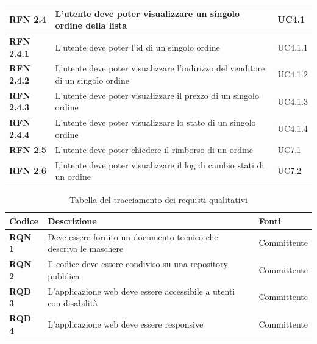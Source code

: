 \begin{longtable}[c]{|l|p{8.4cm}|l|}
\textbf{RFN 2.4} & L’utente deve poter visualizzare un singolo ordine della lista & UC4.1 \\ \hline

\textbf{RFN 2.4.1} & L’utente deve poter l'id di un singolo ordine & UC4.1.1 \\ \hline

\textbf{RFN 2.4.2} & L’utente deve poter visualizzare l'indirizzo del venditore di un singolo ordine & UC4.1.2 \\ \hline

\textbf{RFN 2.4.3} & L’utente deve poter visualizzare il prezzo di un singolo ordine & UC4.1.3 \\ \hline

\textbf{RFN 2.4.4} & L’utente deve poter visualizzare lo stato di un singolo ordine & UC4.1.4 \\ \hline

\textbf{RFN 2.5} & L’utente deve poter chiedere il rimborso di un ordine & UC7.1 \\ \hline

\textbf{RFN 2.6} & L’utente deve poter visualizzare il log di cambio stati di un ordine & UC7.2 \\ \hline

\end{longtable}

\begin{longtable}[c]{|l|p{8.4cm}|l|}
\caption{Tabella del tracciamento dei requisti qualitativi}
\label{tab:requisiti-qualitativi}
\\ \hline
\rowcolor{gray!40}
\textbf{Codice} &
\textbf{Descrizione} &
\textbf{Fonti} \\ \hline
\endhead

\textbf{RQN 1} & Deve essere fornito un documento tecnico che descriva le maschere & Committente \\ \hline

\textbf{RQN 2} & Il codice deve essere condiviso su una repository pubblica & Committente\\ \hline

\textbf{RQD 3} & L’applicazione web deve essere accessibile a utenti con disabilità & Committente\\ \hline

\textbf{RQD 4} & L’applicazione web deve essere responsive & Committente\\ \hline

\end{longtable}